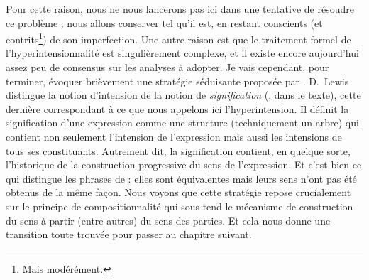 Pour cette raison, nous ne nous lancerons pas ici dans une tentative de résoudre ce problème ; nous allons conserver {\LO} tel qu'il est, en restant conscients (et contrits\footnote{Mais modérément.}) de son imperfection. Une autre raison est que le traitement formel de l'hyperintensionnalité est singulièrement complexe, et il existe encore aujourd'hui assez peu de consensus sur les analyses à adopter.  Je vais cependant, pour terminer, évoquer brièvement une stratégie séduisante proposée par \citet{Lewis:70}. D.~Lewis distingue la notion d'intension de la notion de \emph{signification} (, dans le texte), cette dernière correspondant à ce que nous appelons ici l'hyperintension.  
Il définit la signification d'une expression comme une structure (techniquement un arbre) qui contient non seulement l'intension de l'expression mais aussi les intensions de tous ses constituants. Autrement dit, la signification contient, en quelque sorte, l'historique de la construction progressive du sens de l'expression.  Et c'est bien ce qui distingue les phrases de {\LLast} : elles sont équivalentes mais leurs sens n'ont pas été obtenus de la même façon. 
Nous voyons que cette stratégie repose crucialement sur le principe de compositionnalité qui sous-tend le mécanisme de construction du sens à partir (entre autres) du sens des parties.  Et cela nous donne une transition toute trouvée pour passer au chapitre suivant.





